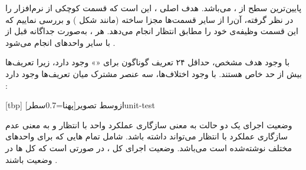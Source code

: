 
پایین‌ترین سطح از ،  می‌باشد. هدف اصلی
، این است که قسمت کوچکی از نرم‌افزار را در نظر گرفته،
آن‌را از سایر قسمت‌ها مجزا ساخته (مانند شکل ) و
بررسی نماییم که این قسمت وظیفه‌ی خود را مطابق انتظار انجام می‌دهد. هر
، به‌صورت جداگانه قبل از  با سایر
واحدهای  انجام می‌شود .

با وجود هدف مشخص، حداقل ۲۴ تعریف گوناگون برای «» وجود
دارد، زیرا تعریف‌ها بیش از حد خاص هستند. با وجود اختلاف‌ها، سه عنصر
مشترک میان تعریف‌ها وجود دارد :






[tbp]
‌ازوسط
‌تصویر[پهنا=0.7‌سطر]{unit-test}

وضعیت اجرای یک  دو حالت  به معنی سازگاری
عملکرد واحد با انتظار و  به معنی عدم سازگاری عملکرد با
انتظار می‌تواند داشته باشد.  شامل تمام ‌هایی که
برای واحدهای مختلف نوشته‌شده است می‌باشد. وضعیت اجرای کل
، در صورتی  است که کل ‌ها در
وضعیت  باشند .

